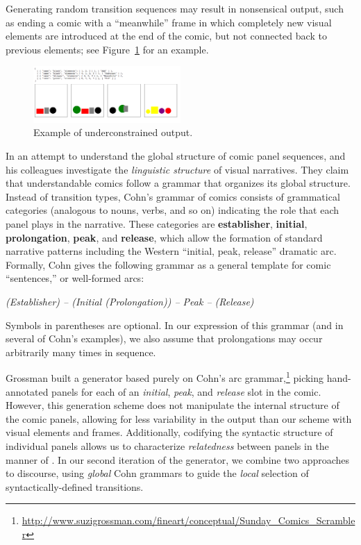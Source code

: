 Generating random transition sequences may result in nonsensical output,
such as ending a comic with a ``meanwhile'' frame in which completely new
visual elements are introduced at the end of the comic, but not connected
back to previous elements; see Figure~\ref{fig:outbad} for an example. 

\begin{figure}
\includegraphics[width=0.5\textwidth]{comicgen-underconstrained-2.png}
\caption{Example of underconstrained output.}
\label{fig:outbad}
\end{figure}

In an attempt to understand the global structure of comic panel sequences,
 and his colleagues investigate the {\em linguistic structure} of
visual narratives. They claim that understandable comics follow a grammar
that organizes its global structure. Instead of transition types, Cohn's
grammar of comics consists of grammatical categories (analogous to nouns,
verbs, and so on) indicating the role that each panel plays in the
narrative. These categories are {\bf establisher}, {\bf initial}, {\bf
prolongation}, {\bf peak}, and {\bf release}, which allow the formation of
standard narrative patterns including the Western ``initial, peak,
release'' dramatic arc. Formally, Cohn gives the following grammar 
as a general template for comic ``sentences,'' or well-formed arcs:

{\it
(Establisher) -- (Initial (Prolongation)) -- Peak -- (Release)}

Symbols in parentheses are optional. In our expression of this grammar (and
in several of Cohn's examples), we also assume that prolongations may occur
arbitrarily many times in sequence.

Grossman built a generator based purely on Cohn's arc grammar,\footnote{
  \url{http://www.suzigrossman.com/fineart/conceptual/Sunday_Comics_Scrambler}
}
picking hand-annotated panels for each of an {\em initial},
{\em peak}, and {\em release} slot in the comic. However, this generation
scheme does not manipulate the internal structure of the comic panels,
allowing for less variability in the output than our scheme with visual
elements and frames. Additionally, codifying the syntactic structure of
individual panels allows us to characterize {\em relatedness} between
panels in the manner of . In our second
iteration of the generator, we combine two approaches to discourse, using
{\em global} Cohn grammars to guide the {\em local} selection of
syntactically-defined transitions.


